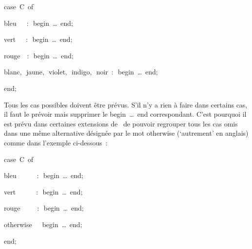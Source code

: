 {\begin{minipage}{\myparboxwidth}
{
\parindent {}
\medskip
\vspace{\neglskip}\mbox{\blc  \blk\idt  \mcl case\idt \ C\ \mcl of\idt }\par 
\vspace{\neglskip}\mbox{\blc  \blk\blk\idt  bleu\ \ \ $:$\ \mcl begin\idt \ \ldots\ \mcl end\idt $;$}\par 
\vspace{\neglskip}\mbox{\blc  \blk\blk\idt  vert\ \ \ $:$\ \mcl begin\idt \ \ldots\ \mcl end\idt $;$}\par 
\vspace{\neglskip}\mbox{\blc  \blk\blk\idt  rouge\ \ $:$\ \mcl begin\idt \ \ldots\ \mcl end\idt $;$}\par 
\vspace{\neglskip}\mbox{\blc  \blk\blk\idt  blanc$,$\ jaune$,$\ violet$,$\ indigo$,$\ noir\ $:$\ \mcl begin\idt \ \ldots\ \mcl end\idt $;$}\par 
\vspace{\neglskip}\mbox{\blc  \blk\idt  \mcl end\idt $;$}\par 
\medskip
}

Tous les cas possibles doivent être prévus. S'il n'y a rien à faire dans certains cas, il faut le prévoir mais
supprimer le {\mcl begin\idt \ \ldots\ \mcl end} correspondant. C'est pourquoi il est prévu dans certaines extensions de 
\pascal\ de pouvoir regrouper tous les cas omis dans une même alternative désignée par le mot
{\mcl otherwise} (`autrement' en anglais) comme dans l'exemple ci-dessous~:

{
\parindent {}
\medskip
\vspace{\neglskip}\mbox{\blc  \blk\idt  \mcl case\idt \ C\ \mcl of\idt }\par 
\vspace{\neglskip}\mbox{\blc  \blk\blk\idt  bleu\ \ \ \ \ \ $:$\ \mcl begin\idt \ \ldots\ \mcl end\idt $;$}\par 
\vspace{\neglskip}\mbox{\blc  \blk\blk\idt  vert\ \ \ \ \ \ $:$\ \mcl begin\idt \ \ldots\ \mcl end\idt $;$}\par 
\vspace{\neglskip}\mbox{\blc  \blk\blk\idt  rouge\ \ \ \ \ $:$\ \mcl begin\idt \ \ldots\ \mcl end\idt $;$}\par 
\vspace{\neglskip}\mbox{\blc  \blk\blk\idt  \mcl otherwise\idt \ \ \ \mcl begin\idt \ \ldots\ \mcl end\idt $;$}\par 
\vspace{\neglskip}\mbox{\blc  \blk\idt  \mcl end\idt $;$}\par 
\medskip
}

 
\vspace{\abovedisplayskip}
\end{minipage}
}
\newpage                 %
\thispagestyle{empty}
